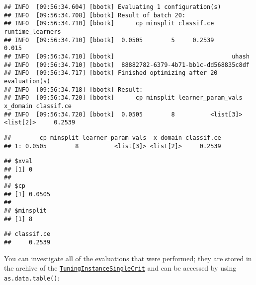 \documentclass[
]{scrbook}
\newenvironment{Shaded}{\begin{snugshade}}{\end{snugshade}}
\newcommand{\FunctionTok}[1]{\textcolor[rgb]{0.00,0.00,0.00}{#1}}
\newcommand{\NormalTok}[1]{#1}
\newcommand{\SpecialCharTok}[1]{\textcolor[rgb]{0.00,0.00,0.00}{#1}}
\renewenvironment{Shaded} {\begin{snugshade}\small} {\end{snugshade}}
\begin{document}
\begin{verbatim}
## INFO  [09:56:34.604] [bbotk] Evaluating 1 configuration(s) 
## INFO  [09:56:34.708] [bbotk] Result of batch 20: 
## INFO  [09:56:34.710] [bbotk]      cp minsplit classif.ce runtime_learners 
## INFO  [09:56:34.710] [bbotk]  0.0505        5     0.2539            0.015 
## INFO  [09:56:34.710] [bbotk]                                 uhash 
## INFO  [09:56:34.710] [bbotk]  88882782-6379-4b71-bb1c-dd568835c8df 
## INFO  [09:56:34.717] [bbotk] Finished optimizing after 20 evaluation(s) 
## INFO  [09:56:34.718] [bbotk] Result: 
## INFO  [09:56:34.720] [bbotk]      cp minsplit learner_param_vals  x_domain classif.ce 
## INFO  [09:56:34.720] [bbotk]  0.0505        8          <list[3]> <list[2]>     0.2539
\end{verbatim}

\begin{verbatim}
##        cp minsplit learner_param_vals  x_domain classif.ce
## 1: 0.0505        8          <list[3]> <list[2]>     0.2539
\end{verbatim}

\begin{Shaded}
\end{Shaded}

\begin{verbatim}
## $xval
## [1] 0
## 
## $cp
## [1] 0.0505
## 
## $minsplit
## [1] 8
\end{verbatim}

\begin{Shaded}
\end{Shaded}

\begin{verbatim}
## classif.ce 
##     0.2539
\end{verbatim}

You can investigate all of the evaluations that were performed; they are stored in the archive of the \href{https://mlr3tuning.mlr-org.com/reference/TuningInstanceSingleCrit.html}{\texttt{TuningInstanceSingleCrit}} and can be accessed by using \texttt{as.data.table()}:

\begin{Shaded}
\end{Shaded}
\end{document}
